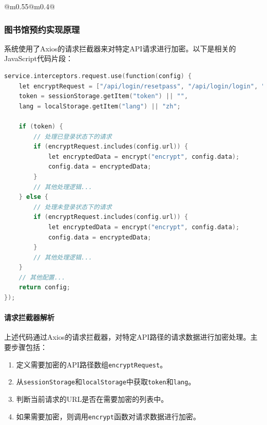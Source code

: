 \documentclass[14pt,a4paper,UTF8,twoside]{article}
\begin{document}
\begin{table}[H]
\begin{tabular}{@{}m{0.55\textwidth}@{}m{0.4\textwidth}@{}}
\begin{minipage}[H]{\linewidth}
            \caption{图书馆预约配置}
            \label{fig:library_config}
        \end{minipage}
    \end{tabular}
\end{table}

\subsubsection{图书馆预约实现原理}

系统使用了Axios的请求拦截器来对特定API请求进行加密。以下是相关的JavaScript代码片段：

\begin{lstlisting}[language=C, caption=请求拦截与加密代码]
service.interceptors.request.use(function(config) {
    let encryptRequest = ["/api/login/resetpass", "/api/login/login", "/api/login/forget", "/api/Seat/confirm", "/api/Seminar/confirm", "/reserve/index/confirm", "/api/Enter/confirm", "/api/Seat/touch_qr_books", "/api/seat/qrcode", "/api/seat/qrcode_not_card", "/api/Study/StudyOrder", "/api/login/updateUserInfo", "/api/seat/xuzuoconfirm"],
    token = sessionStorage.getItem("token") || "",
    lang = localStorage.getItem("lang") || "zh";
    
    if (token) {
        // 处理已登录状态下的请求
        if (encryptRequest.includes(config.url)) {
            let encryptedData = encrypt("encrypt", config.data);
            config.data = encryptedData;
        }
        // 其他处理逻辑...
    } else {
        // 处理未登录状态下的请求
        if (encryptRequest.includes(config.url)) {
            let encryptedData = encrypt("encrypt", config.data);
            config.data = encryptedData;
        }
        // 其他处理逻辑...
    }
    // 其他配置...
    return config;
});
\end{lstlisting}

\paragraph{请求拦截器解析}

上述代码通过Axios的请求拦截器，对特定API路径的请求数据进行加密处理。主要步骤包括：

\begin{enumerate}
    \item 定义需要加密的API路径数组\texttt{encryptRequest}。
    \item 从\texttt{sessionStorage}和\texttt{localStorage}中获取\texttt{token}和\texttt{lang}。
    \item 判断当前请求的URL是否在需要加密的列表中。
    \item 如果需要加密，则调用\texttt{encrypt}函数对请求数据进行加密。
\end{enumerate}
\end{document}
